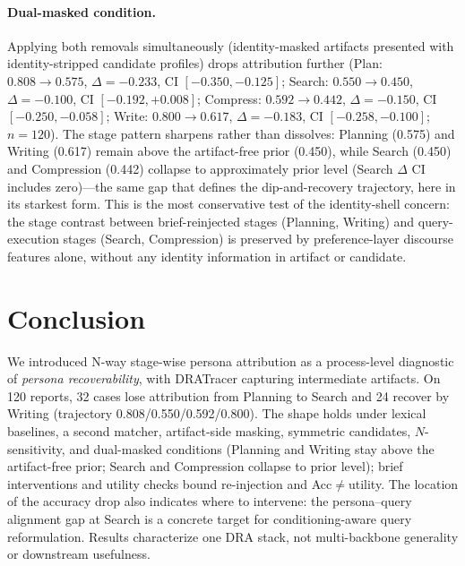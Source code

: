 \documentclass[]{article}
\begin{document}
\paragraph{Dual-masked condition.}
Applying both removals simultaneously (identity-masked artifacts presented with
identity-stripped candidate profiles) drops attribution further
(Plan: $0.808\to0.575$, $\Delta=-0.233$, CI $[-0.350,-0.125]$;
Search: $0.550\to0.450$, $\Delta=-0.100$, CI $[-0.192,+0.008]$;
Compress: $0.592\to0.442$, $\Delta=-0.150$, CI $[-0.250,-0.058]$;
Write: $0.800\to0.617$, $\Delta=-0.183$, CI $[-0.258,-0.100]$; $n=120$).
The stage pattern sharpens rather than dissolves: Planning (0.575) and Writing
(0.617) remain above the artifact-free prior (0.450), while Search (0.450)
and Compression (0.442) collapse to approximately prior level (Search $\Delta$
CI includes zero)---the same gap that defines the dip-and-recovery trajectory,
here in its starkest form.
This is the most conservative test of the identity-shell concern: the stage
contrast between brief-reinjected stages (Planning, Writing) and query-execution
stages (Search, Compression) is preserved by preference-layer discourse features
alone, without any identity information in artifact or candidate.

\FloatBarrier
\section{Conclusion}
\label{sec:conclusion}

We introduced N-way stage-wise persona attribution as a process-level
diagnostic of \emph{persona recoverability}, with DRATracer capturing
intermediate artifacts.
On 120 reports, 32 cases lose attribution from Planning to Search and 24
recover by Writing (trajectory 0.808/0.550/0.592/0.800).
The shape holds under lexical baselines, a second matcher, artifact-side masking,
symmetric candidates, $N$-sensitivity, and dual-masked conditions (Planning and Writing
stay above the artifact-free prior; Search and Compression collapse to prior level);
brief interventions and utility checks bound re-injection and Acc$\neq$utility.
The location of the accuracy drop also indicates where to intervene:
the persona--query alignment gap at Search is a concrete target for
conditioning-aware query reformulation.
Results characterize one DRA stack, not multi-backbone generality or
downstream usefulness.

\end{document}
